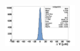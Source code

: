 \documentclass{beamer}
\begin{document}
\begin{frame}
\begin{center}
\begin{columns}[t]
\begin{column}{4cm}
        \
        \includegraphics[width = 4cm, height = 1.8cm]{Pictures/deltaV_8_deformed.png}
      \end{column}
    \end{columns}
  \end{center}

  \vspace{-0.35cm}


\end{frame}

\end{document}
